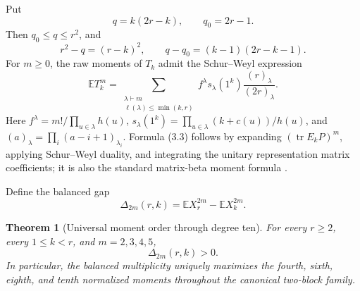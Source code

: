 \documentclass[11pt]{article}
\newtheorem{theorem}{Theorem}[section]
\newcommand{\E}{\mathbb E}
\newcommand{\tr}{\operatorname{tr}}
\begin{document}
Put
\begin{equation}
 q=k(2r-k),\qquad q_0=2r-1.                                \tag{3.1}
\end{equation}
Then $q_0\le q\le r^2$, and
\begin{equation}
 r^2-q=(r-k)^2,\qquad q-q_0=(k-1)(2r-k-1).                 \tag{3.2}
\end{equation}
For $m\ge0$, the raw moments of $T_k$ admit the Schur--Weyl expression
\begin{equation}
 \E T_k^m=
 \sum_{\substack{\lambda\vdash m\\ \ell(\lambda)\le\min(k,r)}}
 f^\lambda s_\lambda(1^k)\frac{(r)_\lambda}{(2r)_\lambda}. \tag{3.3}
\end{equation}
Here $f^\lambda=m!/\prod_{u\in\lambda}h(u)$,
$s_\lambda(1^k)=\prod_{u\in\lambda}(k+c(u))/h(u)$, and
$(a)_\lambda=\prod_i(a-i+1)_{\lambda_i}$.  Formula (3.3) follows by
expanding $(\tr E_kP)^m$, applying Schur--Weyl duality, and integrating the
unitary representation matrix coefficients; it is also the standard
matrix-beta moment formula \cite{James1964,Muirhead1982}.

Define the balanced gap
\begin{equation}
 \Delta_{2m}(r,k)=\E X_r^{2m}-\E X_k^{2m}.                  \tag{3.4}
\end{equation}

\begin{theorem}[Universal moment order through degree ten]
\label{thm:moment}
For every $r\ge2$, every $1\le k<r$, and $m=2,3,4,5$,
\begin{equation}
 \Delta_{2m}(r,k)>0.                                      \tag{3.5}
\end{equation}
In particular, the balanced multiplicity uniquely maximizes the fourth,
sixth, eighth, and tenth normalized moments throughout the canonical
two-block family.
\end{theorem}
\end{document}
